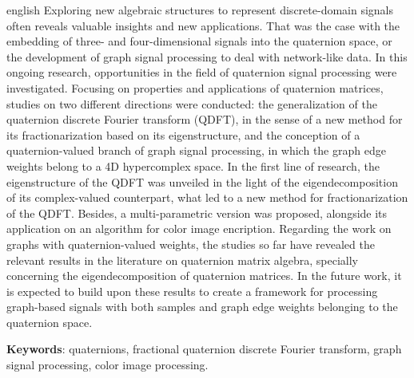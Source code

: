 \documentclass[
	11pt,				%
	openright,			%
	twoside,			%
	a4paper,			%
	french,				%
	brazil,			%
	english				%
	]{abntex2}
\begin{document}
%
\begin{resumo}[Abstract]
\begin{otherlanguage*}{english}
Exploring new algebraic structures to represent discrete-domain signals often reveals valuable insights and new applications. That was the case with the embedding of three- and four-dimensional signals into the quaternion space, or the development of graph signal processing to deal with network-like data. In this ongoing research, opportunities in the field of quaternion signal processing were investigated. Focusing on properties and applications of quaternion matrices, studies on two different directions were conducted: the generalization of the quaternion discrete Fourier transform (QDFT), in the sense of a new method for its fractionarization based on its eigenstructure, and the conception of a quaternion-valued branch of graph signal processing, in which the graph edge weights belong to a 4D hypercomplex space. In the first line of research, the eigenstructure of the QDFT was unveiled in the light of the eigendecomposition of its complex-valued counterpart, what led to a new method for fractionarization of the QDFT. Besides, a multi-parametric version was proposed, alongside its application on an algorithm for color image encription. Regarding the work on graphs with quaternion-valued weights, the studies so far have revealed the relevant results in the literature on quaternion matrix algebra, specially concerning the eigendecomposition of quaternion matrices. In the future work, it is expected to build upon these results to create a framework for processing graph-based signals with both samples and graph edge weights belonging to the quaternion space.

\vspace{\onelineskip}

\noindent 
\textbf{Keywords}: quaternions, fractional quaternion discrete Fourier transform, graph signal processing, color image processing.
\end{otherlanguage*}
\end{resumo}

%
\end{document}
